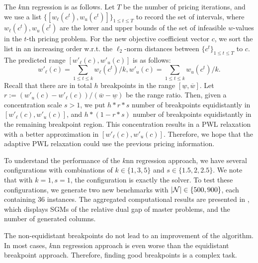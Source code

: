 The  $k$nn regression is as follows. Let $T$ be the number of pricing iterations, and we use a list $\{[w_{\ell}(c^t), w_u(c^t)]\}_{1 \le t \le T}$ to record the set  of intervals, where $w_{\ell}(c^t), w_u(c^t)$ are the lower and upper bounds of the set of infeasible $w$-values in the $t$-th pricing problem. For the new objective coefficient vector $c$, we sort the list in an increasing order w.r.t. the $\ell_2$-norm distances between  $\{c^t\}_{1 \le t \le T}$ to $c$.  The predicted range $[w'_{\ell}(c), w'_{u}(c)]$ is as follows:
\begin{equation*}
    w'_{\ell}(c)= \sum_{1 \le t \le k} w_{\ell}(c^t)  /k,  w'_{u}(c)= \sum_{1 \le t \le k} w_{u}(c^t)  /k.
\end{equation*}
  Recall that there are in total \(h\) breakpoints  in the range \([\underline{w}, \overline{w}]\). Let $r:=(w'_{u}(c) -  w'_{\ell}(c)) / (\overline{w} - \underline{w})$ be the range ratio.
Then, given a concentration scale $ s > 1$,
we put $h* r * s$ number of breakpoints equidistantly in $[w'_{\ell}(c), w'_{u}(c)]$, and $h* (1 - r * s)$ number of breakpoints equidistantly in the remaining breakpoint region. This concentration results in a PWL relaxation with a better approximation in  $[w'_{\ell}(c), w'_{u}(c)]$. Therefore, we hope that the adaptive PWL relaxation could use the previous pricing information.


To understand the performance of the  $k$nn regression approach, we have several configurations with combinations of $k \in \{1,3,5\}$ and $s \in \{ 1.5, 2, 2.5\}$. We note that with $k=1,s = 1$, the configuration is exactly the \dwpwl solver. To test these configurations, we generate two new benchmarks with $|\mathcal N| \in \{500, 900\}$, each containing 36 instances. The aggregated computational results are presented in , which displays SGMs of the relative dual gap of master problems, and the number of generated columns.



 The non-equidistant breakpoints  do not lead to an improvement of the algorithm. In most cases, $k$nn regression approach is even worse than  the equidistant breakpoint approach. Therefore, finding good breakpoints is a complex task.
 
